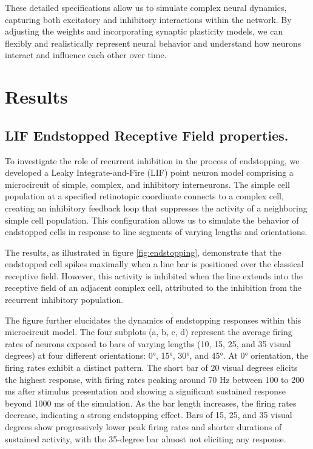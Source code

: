 \documentclass[12pt]{article}
\begin{document}
These detailed specifications allow us to simulate complex neural dynamics, capturing both excitatory and inhibitory interactions within the network. By adjusting the weights and incorporating synaptic plasticity models, we can flexibly and realistically represent neural behavior and understand how neurons interact and influence each other over time.

\section{Results}
\subsection{LIF Endstopped Receptive Field properties.}
To investigate the role of recurrent inhibition in the process of endstopping, we developed a Leaky Integrate-and-Fire (LIF) point neuron model comprising a microcircuit of simple, complex, and inhibitory interneurons. The simple cell population at a specified retinotopic coordinate connects to a complex cell, creating an inhibitory feedback loop that suppresses the activity of a neighboring simple cell population. This configuration allows us to simulate the behavior of endstopped cells in response to line segments of varying lengths and orientations.

The results, as illustrated in figure \ref{fig:endstopping}, demonstrate that the endstopped cell spikes maximally when a line bar is positioned over the classical receptive field. However, this activity is inhibited when the line extends into the receptive field of an adjacent complex cell, attributed to the inhibition from the recurrent inhibitory population.

The figure further elucidates the dynamics of endstopping responses within this microcircuit model. The four subplots (a, b, c, d) represent the average firing rates of neurons exposed to bars of varying lengths (10, 15, 25, and 35 visual degrees) at four different orientations: 0°, 15°, 30°, and 45°. At 0° orientation, the firing rates exhibit a distinct pattern. The short bar of 20 visual degrees elicits the highest response, with firing rates peaking around 70 Hz between 100 to 200 ms after stimulus presentation and showing a significant sustained response beyond 1000 ms of the simulation. As the bar length increases, the firing rates decrease, indicating a strong endstopping effect. Bars of 15, 25, and 35 visual degrees show progressively lower peak firing rates and shorter durations of sustained activity, with the 35-degree bar almost not eliciting any response.
\end{document}
